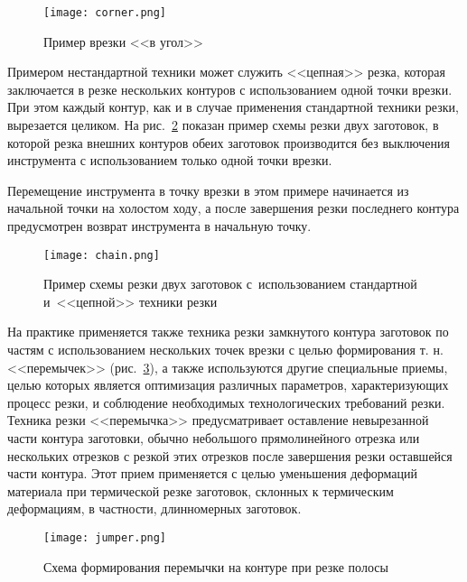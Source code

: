 \begin{figure}[h]
  \begin{center}
  \texttt{[image: corner.png]}
  \caption{Пример врезки <<в угол>>}
  \label{corner}
  \end{center}
\end{figure}

Примером нестандартной техники
может служить <<цепная>> резка,
которая заключается в резке нескольких контуров с
использованием одной точки врезки.
При этом каждый контур,
как и в случае применения стандартной техники резки,
вырезается целиком.
На рис.~\ref{chain}
показан пример схемы резки двух заготовок,
в которой резка внешних контуров обеих заготовок
производится без выключения инструмента
с использованием только одной точки врезки.

Перемещение инструмента в точку врезки
в этом примере начинается из начальной точки на холостом ходу,
а после завершения резки последнего контура
предусмотрен возврат инструмента в начальную точку.

\begin{figure}[h]
  \begin{center}
  \texttt{[image: chain.png]}
  \caption{
    Пример схемы резки двух заготовок
    с~использованием стандартной
    и~<<цепной>> техники резки}
  \label{chain}
  \end{center}
\end{figure}

На практике применяется также техника резки
замкнутого контура заготовок по частям
с использованием нескольких точек врезки
с целью формирования т. н. <<перемычек>>
(рис.~\ref{jumper}),
а также используются другие специальные приемы,
целью которых является оптимизация различных параметров,
характеризующих процесс резки,
и соблюдение необходимых технологических требований резки.
Техника резки <<перемычка>> предусматривает
оставление невырезанной части контура заготовки,
обычно небольшого прямолинейного отрезка или нескольких отрезков
с резкой этих отрезков после завершения резки оставшейся части контура.
Этот прием применяется с целью уменьшения деформаций материала
при термической резке заготовок, склонных к термическим деформациям,
в частности, длинномерных заготовок.

\begin{figure}[h]
  \begin{center}
  \texttt{[image: jumper.png]}
  \caption{Схема формирования перемычки на контуре при резке полосы}
  \label{jumper}
  \end{center}
\end{figure}

